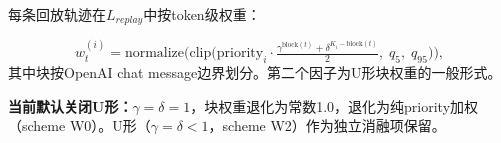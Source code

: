 每条回放轨迹在$L_{replay}$中按token级权重：

\begin{equation}
  w_t^{(i)} = \text{normalize}\!\Big(\text{clip}\big(\text{priority}_i \cdot \tfrac{\gamma^{\text{block}(t)} + \delta^{K_i - \text{block}(t)}}{2},\; q_5,\; q_{95}\big)\Big),
  \label{eq:u-weight}
\end{equation}
其中块按OpenAI chat message边界划分。第二个因子为U形块权重的一般形式。

\textbf{当前默认关闭U形：}$\gamma=\delta=1$，块权重退化为常数1.0，退化为纯priority加权（scheme W0）。U形（$\gamma=\delta<1$，scheme W2）作为独立消融项保留。
